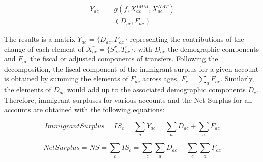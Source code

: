 \begin{equation}
  \begin{split}
    Y_{ac} &= g(f,X^{IMM}_{ac},X^{NAT}_{ac}) \nonumber \\
    &= (D_{ac}, F_{ac}) \label{eq:dc2}
  \end{split}
\end{equation}

The results is a matrix \( Y_{ac} = \{D_{ac}, F_{ac} \} \) representing the contributions of the change of each element of \( X^{r}_{ac} =  \{S^{r}_a, T^{r}_{ac} \}\), with \( D_{ac}\) the demographic components and \( F_{ac}\) the fiscal or adjusted components of transfers.
Following the decomposition, the fiscal component of the immigrant surplus for a given account is obtained by summing the elements of \( F_{ac} \) across ages, \( F_{c}= \displaystyle\sum_{a}F_{ac} \).
Similarly, the elements of \( D_{ac} \) would add up to the associated demographic components \( D_{c}\). Therefore, immigrant surpluses for various accounts and the Net Surplus for all accounts are obtained with the following equations:

\begin{equation}\label{eq:dc3}
  Immigrant Surplus =IS_{c} = \displaystyle\sum_{a}Y_{ac} = \displaystyle\sum_{a}D_{ac} + \displaystyle\sum_{a}F_{ac}
\end{equation}

\begin{equation}\label{eq:dc4}
  Net Surplus = NS = \displaystyle\sum_{c}IS_{c} = \displaystyle\sum_{c}\displaystyle\sum_{a}D_{ac} + \displaystyle\sum_{c}\displaystyle\sum_{a}F_{ac}
\end{equation}

